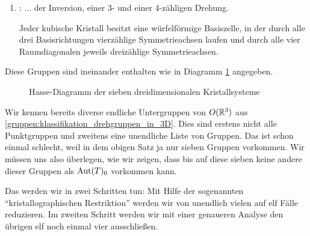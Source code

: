 \begin{theoremdef}
\begin{enumerate}
\item {}: ... der Inversion, einer 3- und einer 4-zähligen Drehung.

Jeder kubische Kristall besitzt eine würfelförmige Basiszelle, in der durch alle drei Basisrichtungen vierzählige Symmetrieachsen laufen und durch alle vier Raumdiagonalen jeweils dreizählige Symmetrieachsen.
\end{enumerate}
Diese Gruppen sind ineinander enthalten wie in Diagramm \ref{kristalle:hasse_diagramm_kristallsysteme} angegeben.
\end{theoremdef}

\begin{figure}[ht]
\label{kristalle:hasse_diagramm_kristallsysteme}
\caption{Hasse-Diagramm der sieben dreidimensionalen Kristallsysteme}
\end{figure}

\begin{remark}
Wir kennen bereits diverse endliche Untergruppen von $O(\mathbb{R}^3)$ aus \ref{gruppen:klassifikation_drehgruppen_in_3D}. Dies sind erstens nicht alle Punktgruppen und zweitens eine unendliche Liste von Gruppen. Das ist schon einmal schlecht, weil in dem obigen Satz ja nur sieben Gruppen vorkommen. Wir müssen uns also überlegen, wie wir zeigen, dass bis auf diese sieben keine andere dieser Gruppen als $\operatorname{Aut}(T)_0$ vorkommen kann.

Das werden wir in zwei Schritten tun: Mit Hilfe der sogenannten \enquote{kristallographischen Restriktion} werden wir von unendlich vielen auf elf Fälle reduzieren. Im zweiten Schritt werden wir mit einer genaueren Analyse den übrigen elf noch einmal vier ausschließen.
\end{remark}

